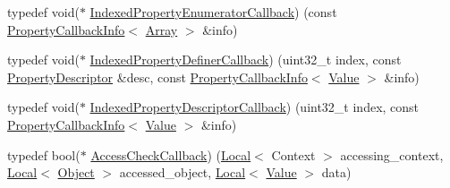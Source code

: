 \begin{DoxyCompactItemize}
\item 
typedef void($\ast$ \mbox{\hyperlink{namespacev8_adbb0a6d5537371953f9ba807d4f6275e}{Indexed\+Property\+Enumerator\+Callback}}) (const \mbox{\hyperlink{classv8_1_1PropertyCallbackInfo}{Property\+Callback\+Info}}$<$ \mbox{\hyperlink{classv8_1_1Array}{Array}} $>$ \&info)
\item 
typedef void($\ast$ \mbox{\hyperlink{namespacev8_a967435db933fa9798caac467948499df}{Indexed\+Property\+Definer\+Callback}}) (uint32\+\_\+t index, const \mbox{\hyperlink{classv8_1_1PropertyDescriptor}{Property\+Descriptor}} \&desc, const \mbox{\hyperlink{classv8_1_1PropertyCallbackInfo}{Property\+Callback\+Info}}$<$ \mbox{\hyperlink{classv8_1_1Value}{Value}} $>$ \&info)
\item 
typedef void($\ast$ \mbox{\hyperlink{namespacev8_a7506e91d70d885b5cbeabdf870ac0e88}{Indexed\+Property\+Descriptor\+Callback}}) (uint32\+\_\+t index, const \mbox{\hyperlink{classv8_1_1PropertyCallbackInfo}{Property\+Callback\+Info}}$<$ \mbox{\hyperlink{classv8_1_1Value}{Value}} $>$ \&info)
\item 
typedef bool($\ast$ \mbox{\hyperlink{namespacev8_a1024fb358d107c1494163217830688e6}{Access\+Check\+Callback}}) (\mbox{\hyperlink{classv8_1_1Local}{Local}}$<$ Context $>$ accessing\+\_\+context, \mbox{\hyperlink{classv8_1_1Local}{Local}}$<$ \mbox{\hyperlink{classv8_1_1Object}{Object}} $>$ accessed\+\_\+object, \mbox{\hyperlink{classv8_1_1Local}{Local}}$<$ \mbox{\hyperlink{classv8_1_1Value}{Value}} $>$ data)
\end{DoxyCompactItemize}
